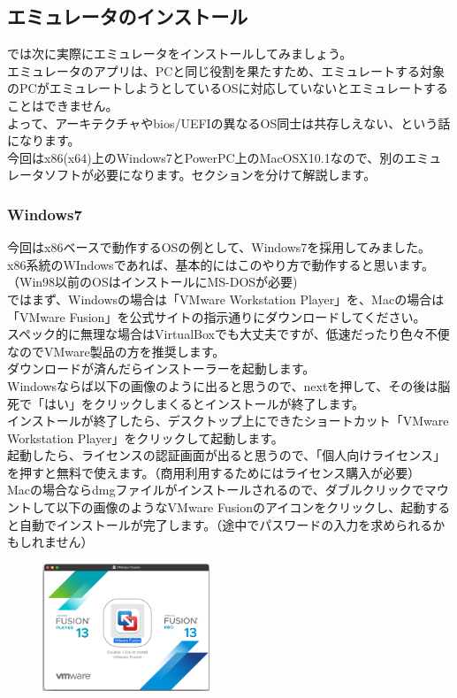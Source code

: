 \documentclass[b5paper,9pt,platex,dvipdfmx]{jsarticle}
\begin{document}
\begin{multicols*}{3}
\section{エミュレータのインストール}
では次に実際にエミュレータをインストールしてみましょう。\\
エミュレータのアプリは、PCと同じ役割を果たすため、エミュレートする対象のPCがエミュレートしようとしているOSに対応していないとエミュレートすることはできません。\\
よって、アーキテクチャやbios/UEFIの異なるOS同士は共存しえない、という話になります。\\
今回はx86(x64)上のWindows7とPowerPC上のMacOSX10.1なので、別のエミュレータソフトが必要になります。セクションを分けて解説します。
\subsubsection{Windows7}
今回はx86ベースで動作するOSの例として、Windows7を採用してみました。\\
x86系統のWIndowsであれば、基本的にはこのやり方で動作すると思います。（Win98以前のOSはインストールにMS-DOSが必要)\\
ではまず、Windowsの場合は「VMware Workstation Player」を、Macの場合は「VMware Fusion」を公式サイトの指示通りにダウンロードしてください。\\
スペック的に無理な場合はVirtualBoxでも大丈夫ですが、低速だったり色々不便なのでVMware製品の方を推奨します。\\
ダウンロードが済んだらインストーラーを起動します。\\
Windowsならば以下の画像のように出ると思うので、nextを押して、その後は脳死で「はい」をクリックしまくるとインストールが終了します。\\
インストールが終了したら、デスクトップ上にできたショートカット「VMware Workstation Player」をクリックして起動します。\\
起動したら、ライセンスの認証画面が出ると思うので、「個人向けライセンス」を押すと無料で使えます。（商用利用するためにはライセンス購入が必要）\\
Macの場合ならdmgファイルがインストールされるので、ダブルクリックでマウントして以下の画像のようなVMware Fusionのアイコンをクリックし、起動すると自動でインストールが完了します。（途中でパスワードの入力を求められるかもしれません）\\
\begin{figure}[H]
  \centering
  \includegraphics[width=5cm]{1.png}

\end{figure}
\end{multicols*}
\end{document}

